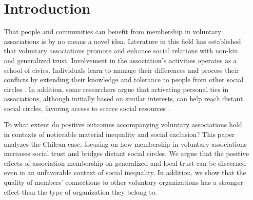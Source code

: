 \newpage


\maketitle

\section{Introduction}

That people and communities can benefit from membership in voluntary associations is by no means a novel idea. Literature in this field has established that voluntary associations promote and enhance social relations with non-kin and generalized trust. Involvement in the association’s activities operates as a school of civics. Individuals learn to manage their differences and process their conflicts by extending their knowledge and tolerance to people from other social circles \parencite{cote_untangling_2009}. In addition, some researchers argue that activating personal ties in associations, although initially based on similar interests, can help reach distant social circles, favoring access to scarce social resources \parencite{diani_social_1997, tindall_network_2012, benton_uniters_2016, baggetta_representative_2016, bekkers_social_2008}. 
\bigskip

To what extent do positive outcomes accompanying voluntary associations hold in contexts of noticeable material inequality and social exclusion? This paper analyzes the Chilean case, focusing on how membership in voluntary associations increases social trust and bridges distant social circles. We argue that the positive effects of association membership on generalized and local trust can be discerned even in an unfavorable context of social inequality. In addition, we show that the quality of members' connections to other voluntary organizations has a stronger effect than the type of organization they belong to.
\bigskip

